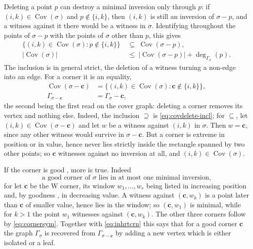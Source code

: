 \documentclass[12pt]{article}
\def\xspace{ }%
\theoremstyle{definition}
\newcommand{\good}{good\xspace}
\newcommand{\goodness}{goodness\xspace}
\newcommand{\Cov}{\operatorname{Cov}}  %
\newcommand{\Wcr}{W\xspace}    %
\newcommand{\crn}{\mathbf{c}}              %
\newcommand{\cgr}{\Gamma}                 %
\begin{document}
Deleting a point $p$ can destroy a minimal inversion only through $p$:
if $(i,k) \in \Cov(\sigma)$ and $p \notin \{i,k\}$, then $(i,k)$ is still
an inversion of $\sigma - p$, and a witness against it there would be a
witness in $\sigma$. Identifying throughout the points of $\sigma - p$
with the points of $\sigma$ other than $p$, this gives
\begin{subequations}\label{eq:covdelete}
\begin{align}
   \{(i,k) \in \Cov(\sigma) : p \notin \{i,k\}\}
   &\;\subseteq\; \Cov(\sigma - p) ,
   \label{eq:covdelete-incl}\\
   |\Cov(\sigma)|
   &\;\le\; |\Cov(\sigma - p)| + \deg_{\cgr_\sigma}(p) .
   \label{eq:covdelete-count}
\end{align}
\end{subequations}
The inclusion is in general strict, the deletion of a witness turning a
non-edge into an edge. For a corner it is an equality,
\begin{subequations}\label{eq:covcorner}
\begin{align}
   \Cov(\sigma-\crn) &= \{(i,k) \in \Cov(\sigma) : \crn \notin \{i,k\}\},
   \label{eq:covcorner-set}\\
   \cgr_{\sigma-\crn} &= \cgr_\sigma - \crn ,
   \label{eq:inhrtcrn}
\end{align}
\end{subequations}
the second being the first read on the cover graph: deleting a corner
removes its vertex and nothing else. Indeed, the inclusion $\supseteq$ is
\eqref{eq:covdelete-incl}; for $\subseteq$, let $(i,k) \in
\Cov(\sigma-\crn)$ and let $w$ be a witness against $(i,k)$ in $\sigma$.
Then $w = \crn$, since any other witness would survive in
$\sigma - \crn$. But a corner is extreme in position or in value, hence
never lies strictly inside the rectangle spanned by two other points; so
$\crn$ witnesses against no inversion at all, and $(i,k) \in
\Cov(\sigma)$.

If the corner is \good, more is true. Indeed
\begin{equation}\label{eq:gooddegree}
\text{a \good corner of $\sigma$ lies in at most one minimal inversion,}
\end{equation}
for let $\crn$ be the \Wcr corner, its window $w_1,\dots,w_r$ being
listed in increasing position and, by \goodness, in decreasing value.
A witness against $(\crn,w_k)$ is a point later than $\crn$ of smaller
value, hence lies in the window; so $(\crn,w_1)$ is minimal, while for
$k > 1$ the point $w_1$ witnesses against $(\crn,w_k)$. The other three
corners follow by \eqref{eq:cornersym}. Together with
\eqref{eq:inhrtcrn} this says that for a \good corner $\crn$ the graph
$\cgr_\sigma$ is recovered from $\cgr_{\sigma-\crn}$ by adding a new
vertex which is either isolated or a leaf.
\end{document}
